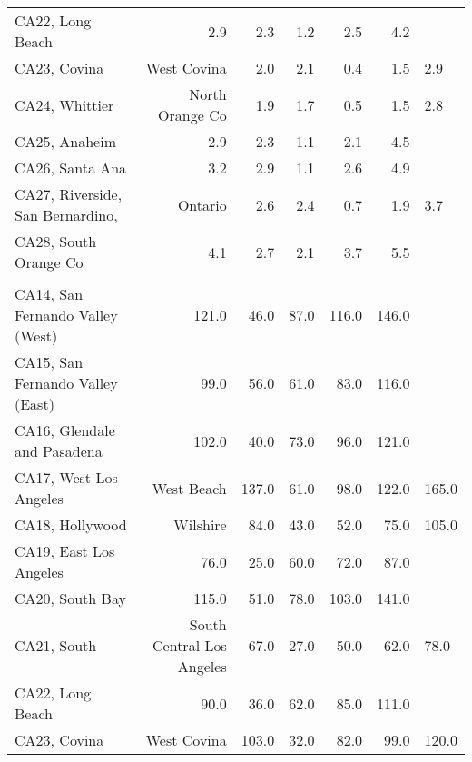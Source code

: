 \begin{longtable}[l]{l|rrrrr}
\hspace{1em}CA22, Long Beach & 2.9 & 2.3 & 1.2 & 2.5 & 4.2\\
\hspace{1em}CA23, Covina & West Covina & 2.0 & 2.1 & 0.4 & 1.5 & 2.9\\
\hspace{1em}CA24, Whittier & North Orange Co & 1.9 & 1.7 & 0.5 & 1.5 & 2.8\\
\hspace{1em}CA25, Anaheim & 2.9 & 2.3 & 1.1 & 2.1 & 4.5\\
\hspace{1em}CA26, Santa Ana & 3.2 & 2.9 & 1.1 & 2.6 & 4.9\\
\hspace{1em}CA27, Riverside, San Bernardino, & Ontario & 2.6 & 2.4 & 0.7 & 1.9 & 3.7\\
\hspace{1em}CA28, South Orange Co & 4.1 & 2.7 & 2.1 & 3.7 & 5.5\\
\addlinespace[0.5em]
\\
\hspace{1em}CA14, San Fernando Valley (West) & 121.0 & 46.0 & 87.0 & 116.0 & 146.0\\
\hspace{1em}CA15, San Fernando Valley (East) & 99.0 & 56.0 & 61.0 & 83.0 & 116.0\\
\hspace{1em}CA16, Glendale and Pasadena & 102.0 & 40.0 & 73.0 & 96.0 & 121.0\\
\hspace{1em}CA17, West Los Angeles & West Beach & 137.0 & 61.0 & 98.0 & 122.0 & 165.0\\
\hspace{1em}CA18, Hollywood & Wilshire & 84.0 & 43.0 & 52.0 & 75.0 & 105.0\\
\hspace{1em}CA19, East Los Angeles & 76.0 & 25.0 & 60.0 & 72.0 & 87.0\\
\hspace{1em}CA20, South Bay & 115.0 & 51.0 & 78.0 & 103.0 & 141.0\\
\hspace{1em}CA21, South & South Central Los Angeles & 67.0 & 27.0 & 50.0 & 62.0 & 78.0\\
\hspace{1em}CA22, Long Beach & 90.0 & 36.0 & 62.0 & 85.0 & 111.0\\
\hspace{1em}CA23, Covina & West Covina & 103.0 & 32.0 & 82.0 & 99.0 & 120.0\\

\end{longtable}
